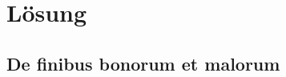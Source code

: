 %
%
%
\section{Lösung
\label{vanderpol:section:loesung}}



\subsection{De finibus bonorum et malorum
\label{vanderpol:subsection:bonorum}}


